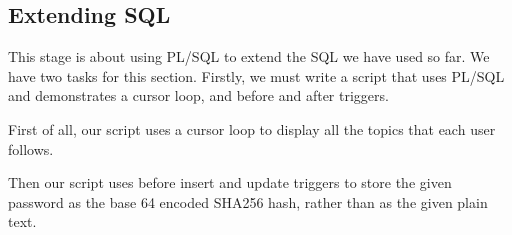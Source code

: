 \subsection{Extending SQL}

This stage is about using PL/SQL to extend the SQL we have used so far. We have two tasks for this section. Firstly, we must write a script that uses PL/SQL and demonstrates a cursor loop, and before and after triggers.

First of all, our script uses a cursor loop to display all the topics that each user follows.

Then our script uses before insert and update triggers to store the given password as the base 64 encoded SHA256 hash, rather than as the given plain text.